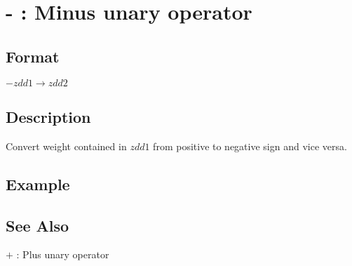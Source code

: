 
\section{- : Minus unary operator\label{sect:minus_op}}
\subsection*{Format}
$- zdd1 \rightarrow zdd2$

\subsection*{Description}
Convert weight contained in $zdd1$ from positive to negative sign and vice versa.  


\subsection*{Example}


\subsection*{See Also}
\hyperref[sect:plus_op]{$+$} : Plus unary operator
